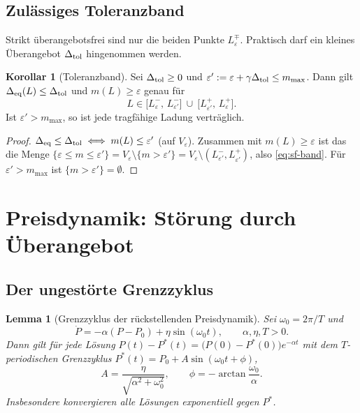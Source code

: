 \documentclass[a4paper, 12pt, twoside, openright]{report}
\newtheorem{lemma}[theorem]{Lemma}
\theoremstyle{definition}
\theoremstyle{definition}
\newtheorem{korollar}{Korollar}[chapter]
\begin{document}
\subsection{Zulässiges Toleranzband}

Strikt überangebotsfrei sind nur die beiden Punkte $L_\varepsilon^\mp$. Praktisch
darf ein kleines Überangebot $\Delta_{\rm tol}$ hingenommen werden.

\begin{korollar}[Toleranzband]\label{kor:sf-band}
Sei $\Delta_{\rm tol}\ge0$ und $\varepsilon':=\varepsilon+\gamma\Delta_{\rm tol}\le m_{\max}$.
Dann gilt $\Delta_{\rm eq}(L)\le\Delta_{\rm tol}$ und $m(L)\ge\varepsilon$ genau für
\begin{equation}
  L\in\bigl[L_\varepsilon^-,\,L_{\varepsilon'}^-\bigr]\ \cup\ \bigl[L_{\varepsilon'}^+,\,L_\varepsilon^+\bigr].
  \label{eq:sf-band}
\end{equation}
Ist $\varepsilon'>m_{\max}$, so ist jede tragfähige Ladung verträglich.
\end{korollar}

\begin{proof}
$\Delta_{\rm eq}\le\Delta_{\rm tol}\iff m(L)\le\varepsilon'$ (auf $V_\varepsilon$).
Zusammen mit $m(L)\ge\varepsilon$ ist das die Menge
$\{\varepsilon\le m\le\varepsilon'\}=V_\varepsilon\setminus\{m>\varepsilon'\}
=V_\varepsilon\setminus(L_{\varepsilon'}^-,L_{\varepsilon'}^+)$, also \eqref{eq:sf-band}.
Für $\varepsilon'>m_{\max}$ ist $\{m>\varepsilon'\}=\emptyset$.
\end{proof}

\section{Preisdynamik: Störung durch Überangebot}\label{sec:sf-preis}

\subsection{Der ungestörte Grenzzyklus}

\begin{lemma}[Grenzzyklus der rückstellenden Preisdynamik]\label{lem:sf-zyklus}
Sei $\omega_0=2\pi/T$ und
\begin{equation}
  \dot P=-\alpha(P-P_0)+\eta\sin(\omega_0t),\qquad\alpha,\eta,T>0 .
  \label{eq:sf-P}
\end{equation}
Dann gilt für jede Lösung
$P(t)-P^*(t)=\bigl(P(0)-P^*(0)\bigr)e^{-\alpha t}$ mit dem $T$-periodischen
Grenzzyklus $P^*(t)=P_0+A\sin(\omega_0t+\phi)$,
\begin{equation}
  A=\frac{\eta}{\sqrt{\alpha^2+\omega_0^2}},\qquad\phi=-\arctan\frac{\omega_0}{\alpha}.
  \label{eq:sf-A}
\end{equation}
Insbesondere konvergieren alle Lösungen exponentiell gegen $P^*$.
\end{lemma}
\end{document}
